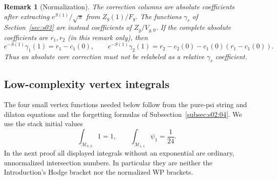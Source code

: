 \documentclass[a4paper,10pt]{article}
\numberwithin{equation}{section}
\newcommand{\MM}{\overline{\mathcal{M}}}
\theoremstyle{paperplain}
\theoremstyle{paperremark}
\newtheorem{rmk}{Remark}[section]
\theoremstyle{paperplain}
\begin{document}
\begin{rmk}[Normalization]
The correction columns are absolute coefficients after extracting
$e^{S(1)}/\sqrt\pi$ from $Z_g(1)/F_g$. The functions $\gamma_r$ of
Section~\ref{sec:s03} are instead coefficients of $Z_g/V_{g,0}$.
If the complete absolute coefficients are $r_1,r_2$ (in this remark
only), then
\[
 e^{-S(1)}\gamma_1(1)=r_1-c_1(0),\qquad
 e^{-S(1)}\gamma_2(1)=r_2-c_2(0)-c_1(0)(r_1-c_1(0)).
\]
Thus an absolute core correction must not be relabeled as a relative
$\gamma_r$ coefficient.
\end{rmk}

\subsection{Low-complexity vertex integrals}
\label{subsec:a:03}

The four small vertex functions needed below follow from the pure-psi
string and dilaton equations and the forgetting formulas of
Subsection~\ref{subsec:s02:04}. We use the stack initial values
\[
 \int_{\MM_{0,3}}1=1,\qquad
 \int_{\MM_{1,1}}\psi_1=\frac1{24}.
\]
In the next proof all displayed integrals without an exponential are
ordinary, unnormalized intersection numbers. In particular they are
neither the Introduction's Hodge bracket nor the normalized WP brackets.
\end{document}
